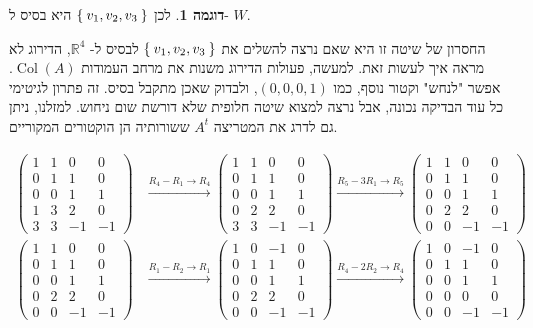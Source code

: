 \documentclass[12pt]{report}
\theoremstyle{plain}
\theoremstyle{definition}
\newtheorem{example}{דוגמה}[chapter]
\newcommand{\R}{\mathbb{R}}
\newcommand{\0}{\mathbf{0}}
\DeclareMathOperator{\Col}{Col}
\begin{document}
\begin{example}
לכן
$\Set{v_1,v_2,v_3}$
היא בסיס ל-
$W$.

החסרון של שיטה זו היא שאם נרצה להשלים את
$\Set{v_1,v_2,v_3}$
לבסיס ל-
$\R^4$,
הדירוג לא מראה איך לעשות זאת. למעשה, פעולות הדירוג משנות את מרחב העמודות
$\Col(A)$.
אפשר "לנחש" וקטור נוסף, כמו 
$(0,0,0,1)$,
ולבדוק שאכן מתקבל בסיס. זה פתרון לגיטימי כל עוד הבדיקה נכונה, אבל נרצה למצוא שיטה חלופית שלא דורשת שום ניחוש. למזלנו, ניתן גם לדרג את המטריצה 
$A^t$
ששורותיה הן הוקטורים המקוריים.

$$
\begin{aligned}
\begin{pmatrix}
1&1&0&0\\
0&1&1&0\\
0&0&1&1\\
1&3&2&0\\
3&3&-1&-1
\end{pmatrix}
&\xrightarrow{R_4-R_1\to R_4}
\begin{pmatrix}
1&1&0&0\\
0&1&1&0\\
0&0&1&1\\
0&2&2&0\\
3&3&-1&-1
\end{pmatrix}
\xrightarrow{R_5-3R_1\to R_5}
\begin{pmatrix}
1&1&0&0\\
0&1&1&0\\
0&0&1&1\\
0&2&2&0\\
0&0&-1&-1
\end{pmatrix}
\\[10pt]
\begin{pmatrix}
1&1&0&0\\
0&1&1&0\\
0&0&1&1\\
0&2&2&0\\
0&0&-1&-1
\end{pmatrix}
&\xrightarrow{R_1-R_2\to R_1}
\begin{pmatrix}
1&0&-1&0\\
0&1&1&0\\
0&0&1&1\\
0&2&2&0\\
0&0&-1&-1
\end{pmatrix}
\xrightarrow{R_4-2R_2\to R_4}
\begin{pmatrix}
1&0&-1&0\\
0&1&1&0\\
0&0&1&1\\
0&0&0&0\\
0&0&-1&-1

\end{pmatrix}
\end{aligned}$$
\end{example}
\end{document}
